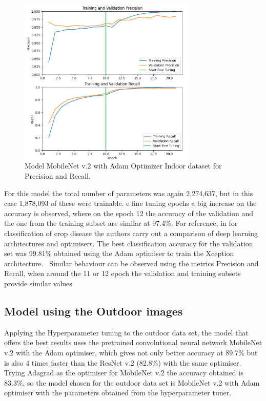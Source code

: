 \documentclass[conference]{IEEEtran}
\begin{document}
\begin{figure}[htbp]
\centerline{\includegraphics[width=8.5cm]{ModelIndoorsMobileNetPrecRecchart.png}}
\caption{Model MobileNet v.2 with Adam Optimizer Indoor dataset for Precision and Recall.}
\label{fig}
\end{figure}

For this model the total number of parameters was again 2,274,637, but in this case 1,878,093 of these were trainable. e fine tuning epochs a big increase on the accuracy is observed, where on the epoch 12 the accuracy of the validation and the one from the training subset are similar at 97.4\%. For reference, in\cite{saleem2020plant} for classification of crop disease the authors carry out a comparison of deep learning architectures and optimisers. The best classification accuracy for the validation set was 99.81\% obtained using the Adam optimiser to train the Xception architecture. \
Similar behaviour can be observed using the metrics Precision and Recall, when around the 11 or 12 epoch the validation and training subsets provide similar values. 

\subsection{Model using the Outdoor images}
Applying the Hyperparameter tuning to the outdoor data set, the model that offers the best results uses the pretrained convolutional neural network MobileNet v.2 with the Adam optimiser, which gives not only better accuracy at 89.7\% but is also 4 times faster than the ResNet v.2 (82.8\%) with the same optimiser. Trying Adagrad as the optimiser for MobileNet v.2 the accuracy obtained is 83.3\%, so the model chosen for the outdoor data set is MobileNet v.2 with Adam optimiser with the parameters obtained from the hyperparameter tuner. 
\end{document}
